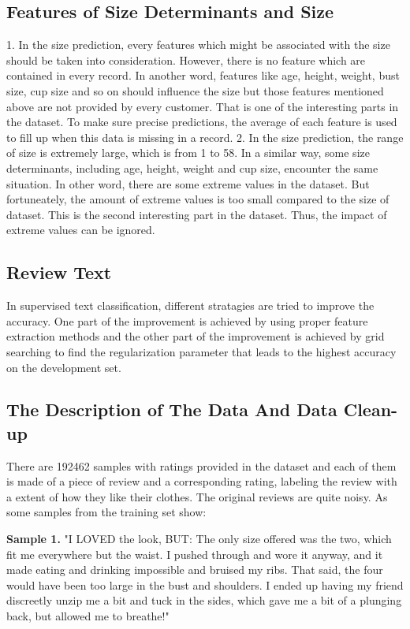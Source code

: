 \documentclass[letterpaper, 10 pt, conference]{ieeeconf}  %
\begin{document}
	\subsection{Features of Size Determinants and Size} 
	1. In the size prediction, every features which might be associated with the size should be taken into consideration. However, there is no feature which are contained in every record. In another word, features like age, height, weight, bust size, cup size and so on should influence the size but those features mentioned above are not provided by every customer. That is one of the interesting parts in the dataset. To make sure precise predictions, the average of each feature is used to fill up when this data is missing in a record.
	2. In the size prediction, the range of size is extremely large, which is from 1 to 58. In a similar way, some size determinants, including age, height, weight and cup size, encounter the same situation. In other word, there are some extreme values in the dataset. But fortuneately, the amount of extreme values is too small compared to the size of dataset. This is the second interesting part in the dataset. Thus, the impact of extreme values can be ignored.

	\subsection{Review Text}
	In supervised text classification, different stratagies are tried to improve the accuracy. One part of the improvement is achieved by using proper feature extraction methods and the other part of the improvement is achieved by grid searching to find the regularization parameter that leads to the highest accuracy on the development set.
	
	
\subsection{The Description of The Data And Data Clean-up}

There are 192462 samples with ratings provided in the dataset and each of them is made of a piece of review and a corresponding rating, labeling the review with a extent of how they like their clothes.
The original reviews are quite noisy. As some samples from the training set show:

\textbf{Sample 1.} "I LOVED the look, BUT: The only size offered was the two, which fit me everywhere but the waist. I pushed through and wore it anyway, and it made eating and drinking impossible and bruised my ribs. That said, the four would have been too large in the bust and shoulders. I ended up having my friend discreetly unzip me a bit and tuck in the sides, which gave me a bit of a plunging back, but allowed me to breathe!"
\end{document}
